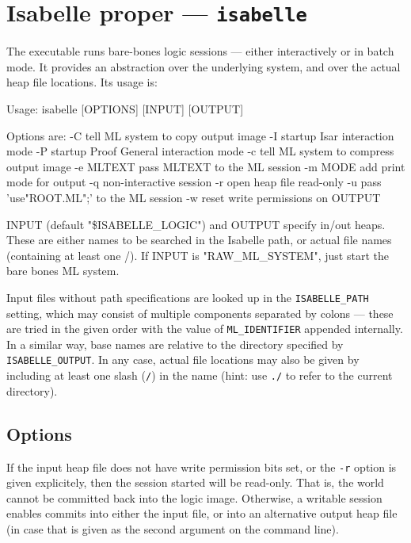 \section{Isabelle proper --- \texttt{isabelle}}

The  executable runs bare-bones logic sessions --- either
interactively or in batch mode. It provides an abstraction over the underlying
{\ML} system, and over the actual heap file locations. Its usage is:
\begin{ttbox}
Usage: isabelle [OPTIONS] [INPUT] [OUTPUT]

  Options are:
    -C           tell ML system to copy output image
    -I           startup Isar interaction mode
    -P           startup Proof General interaction mode
    -c           tell ML system to compress output image
    -e MLTEXT    pass MLTEXT to the ML session
    -m MODE      add print mode for output
    -q           non-interactive session
    -r           open heap file read-only
    -u           pass 'use"ROOT.ML";' to the ML session
    -w           reset write permissions on OUTPUT

  INPUT (default "\$ISABELLE_LOGIC") and OUTPUT specify in/out heaps.
  These are either names to be searched in the Isabelle path, or
  actual file names (containing at least one /).
  If INPUT is "RAW_ML_SYSTEM", just start the bare bones ML system.
\end{ttbox}
Input files without path specifications are looked up in the
\texttt{ISABELLE_PATH} setting, which may consist of multiple components
separated by colons --- these are tried in the given order with the value of
\texttt{ML_IDENTIFIER} appended internally.  In a similar way, base names are
relative to the directory specified by \texttt{ISABELLE_OUTPUT}.  In any case,
actual file locations may also be given by including at least one slash
(\texttt{/}) in the name (hint: use \texttt{./} to refer to the current
directory).


\subsection*{Options}

If the input heap file does not have write permission bits set, or the
\texttt{-r} option is given explicitely, then the session started will be
read-only.  That is, the {\ML} world cannot be committed back into the logic
image.  Otherwise, a writable session enables commits into either the input
file, or into an alternative output heap file (in case that is given as the
second argument on the command line).

